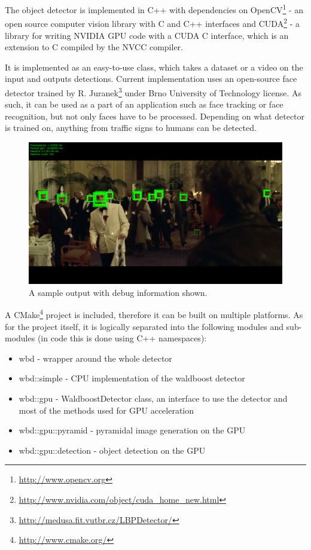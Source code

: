 The object detector is implemented in C++ with dependencies on OpenCV\footnote{\url{http://www.opencv.org}} - an open source computer vision library with C and C++ interfaces and CUDA\footnote{\url{http://www.nvidia.com/object/cuda_home_new.html}} - a library for writing NVIDIA GPU code with a CUDA C interface, which is an extension to C compiled by the NVCC compiler.

It is implemented as an easy-to-use class, which takes a dataset or a video on the input and outputs detections. Current implementation uses an open-source face detector trained by R. Juranek\footnote{\url{http://medusa.fit.vutbr.cz/LBPDetector/}} under Brno University of Technology license. As such, it can be used as a part of an application such as face tracking or face recognition, but not only faces have to be processed. Depending on what detector is trained on, anything from traffic signs to humans can be detected.

\begin{center}
\begin{figure}[ht]
	\centering\includegraphics[width=\textwidth]{fig/sample.jpg}
	\caption{A sample output with debug information shown.}
	\label{fig:sample}
\end{figure}
\end{center}

A CMake\footnote{\url{http://www.cmake.org/}} project is included, therefore it can be built on multiple platforms. As for the project itself, it is logically separated into the following modules and sub-modules (in code this is done using C++ namespaces):

\begin{itemize}
	\item wbd - wrapper around the whole detector
	\item wbd::simple - CPU implementation of the waldboost detector
	\item wbd::gpu - WaldboostDetector class, an interface to use the detector and most of the methods used for GPU acceleration
	\item wbd::gpu::pyramid - pyramidal image generation on the GPU
	\item wbd::gpu::detection - object detection on the GPU
\end{itemize}

